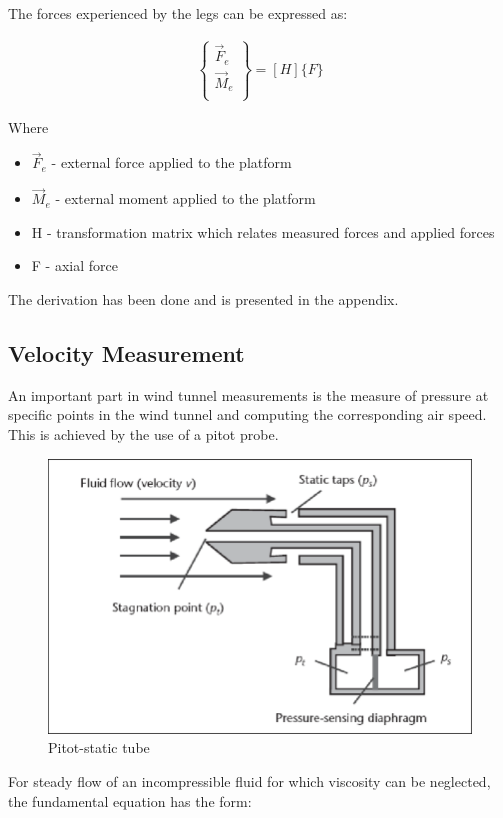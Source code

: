 The forces experienced by the legs can be expressed as:
\begin{ceqn}
\begin{align}
	\begin{Bmatrix}
		\vec{F}_e \\
		\vec{M}_e \\
	\end{Bmatrix} = [H]\{F\}
\end{align}
\end{ceqn}

Where 
\begin{itemize}
\item $\vec{F}_e $ - external force applied to the platform
\item $\vec{M}_e$ - external moment applied to the platform
\item H - transformation matrix which relates measured forces and applied forces
\item F - axial force
\end{itemize}  
The derivation has been done and is presented in the appendix.


\subsection{Velocity Measurement}
An important part in wind tunnel measurements is the measure of pressure at specific points in the wind tunnel and computing the corresponding air speed. This is achieved by the use of a pitot probe. 
\begin{center}
\begin{figure}[H]
\centering
\includegraphics[width=0.6\linewidth]{Figures/pitot}
\caption[Pitot-static tube]{Pitot-static tube \cite{viquerat_continuous_2006}}
\end{figure}
\end{center}
For steady flow of an incompressible fluid for which viscosity can be neglected, the fundamental equation has the form\cite{viquerat_continuous_2006}:

